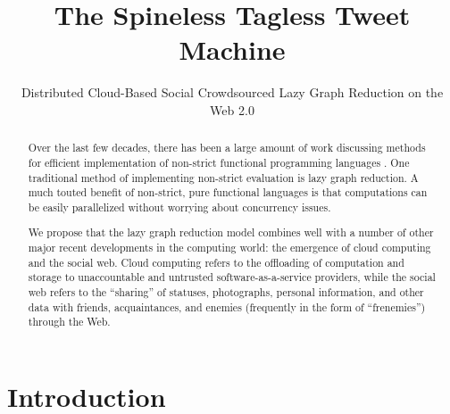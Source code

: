 \documentclass[preprint]{sigplanconf}
\title{The Spineless Tagless Tweet Machine}
\subtitle{Distributed Cloud-Based Social Crowdsourced Lazy Graph Reduction on the Web 2.0}
\begin{document}
\maketitle

\begin{abstract}

Over the last few decades, there has been a large amount of work
discussing methods for efficient implementation of non-strict
functional programming languages \cite{Jones92implementinglazy}
\cite{Naylor:2010:RR:1932681.1863556}. One traditional method of
implementing non-strict evaluation is lazy graph reduction. A much
touted benefit of non-strict, pure functional languages is that
computations can be easily parallelized without worrying about
concurrency issues.

We propose that the lazy graph reduction model combines well with a
number of other major recent developments in the computing world: the
emergence of cloud computing and the social web. Cloud computing
refers to the offloading of computation and storage to unaccountable
and untrusted software-as-a-service providers, while the social web
refers to the ``sharing'' of statuses, photographs, personal
information, and other data with friends, acquaintances, and enemies
(frequently in the form of ``frenemies'') through the Web.



\end{abstract}

\section{Introduction}


{}

\end{document}
